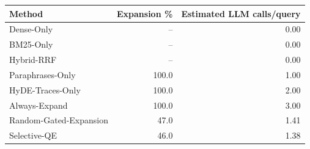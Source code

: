 \begin{tabular}{lrr}
\toprule
Method & Expansion \% & Estimated LLM calls/query \\
\midrule
Dense-Only & -- & 0.00 \\
BM25-Only & -- & 0.00 \\
Hybrid-RRF & -- & 0.00 \\
Paraphrases-Only & 100.0 & 1.00 \\
HyDE-Traces-Only & 100.0 & 2.00 \\
Always-Expand & 100.0 & 3.00 \\
Random-Gated-Expansion & 47.0 & 1.41 \\
Selective-QE & 46.0 & 1.38 \\
\bottomrule
\end{tabular}
